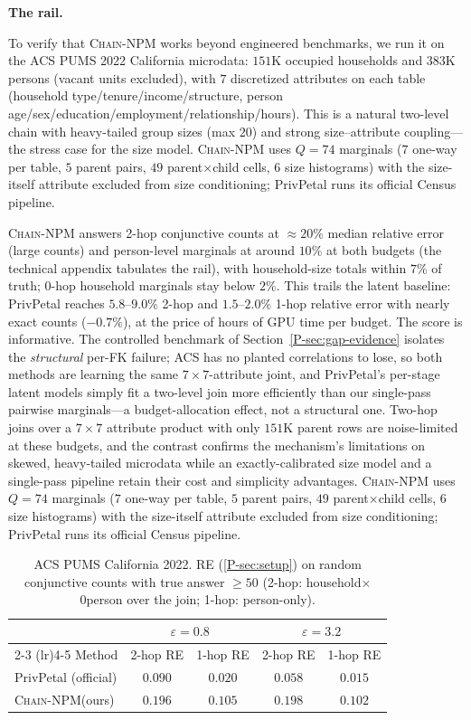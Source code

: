 \documentclass[sigconf, nonacm]{acmart}
\newcommand{\chainnpm}{\textsc{Chain-NPM}\xspace}
\newcommand{\pref}[1]{\ref{P-#1}}
\begin{document}
\textbf{The rail.}

To verify that \chainnpm works beyond engineered benchmarks, we run it on
the ACS PUMS 2022 California microdata: $151$K occupied households and
$383$K persons (vacant units excluded), with $7$ discretized attributes on
each table (household type\slash tenure\slash income\slash structure, person
age\slash sex\slash education\slash employment\slash relationship\slash hours). This is a natural
two-level chain with heavy-tailed group sizes (max $20$) and strong
size--attribute coupling---the stress case for the size model.
\chainnpm uses $Q{=}74$ marginals ($7$ one-way per table, $5$ parent pairs,
$49$ parent$\times$child cells, $6$ size histograms) with the size-itself
attribute excluded from size conditioning; PrivPetal runs its official
Census pipeline.

\chainnpm answers 2-hop conjunctive counts at $\approx 20\%$ median
relative error (large counts) and person-level marginals at around $10\%$
at both budgets (the technical appendix tabulates the rail), with
household-size totals within
$7\%$ of truth; 0-hop
household marginals stay below $2\%$. This trails the latent baseline:
PrivPetal reaches $5.8$--$9.0\%$ 2-hop and $1.5$--$2.0\%$ 1-hop relative
error with nearly exact counts ($-0.7\%$), at the price of hours of GPU
time per budget. The score is informative. The controlled benchmark of
Section~\ref{P-sec:gap-evidence} isolates the \emph{structural} per-FK
failure; ACS has no planted correlations to lose, so both methods are
learning the same $7{\times}7$-attribute joint, and PrivPetal's
per-stage latent models simply fit a two-level join more efficiently than
our single-pass pairwise marginals---a budget-allocation effect, not a
structural one. Two-hop joins over a $7{\times}7$ attribute product with
only $151$K parent rows are noise-limited at these budgets, and the
contrast confirms the mechanism's limitations on skewed, heavy-tailed
microdata while an exactly-calibrated size model and a single-pass
pipeline retain their cost and simplicity advantages.
\chainnpm uses $Q{=}74$ marginals ($7$ one-way per table, $5$ parent pairs,
$49$ parent$\times$child cells, $6$ size histograms) with the size-itself
attribute excluded from size conditioning; PrivPetal runs its official
Census pipeline.

\begin{table}[t]
\centering
\caption{ACS PUMS California 2022. RE (\pref{sec:setup}) on random
conjunctive counts with true answer $\ge 50$ (2-hop: household$\times$\penalty0person
over the join; 1-hop: person-only).}
\label{tab:acs}
\small
\begin{tabular}{@{}lcccc@{}}
\toprule
 & \multicolumn{2}{c}{$\varepsilon{=}0.8$} & \multicolumn{2}{c}{$\varepsilon{=}3.2$} \\
\cmidrule(lr){2-3} \cmidrule(lr){4-5}
Method & 2-hop RE & 1-hop RE & 2-hop RE & 1-hop RE \\
\midrule
PrivPetal (official) & $0.090$ & $0.020$ & $0.058$ & $0.015$ \\
\chainnpm (ours) & $0.196$ & $0.105$ & $0.198$ & $0.102$ \\
\bottomrule
\end{tabular}
\end{table}
\end{document}
